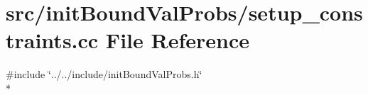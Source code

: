 \section{src/init\-Bound\-Val\-Probs/setup\-\_\-constraints.cc File Reference}
\label{setup__constraints_8cc}
{\ttfamily \#include \char`\"{}../../include/init\-Bound\-Val\-Probs.\-h\char`\"{}}\\*
